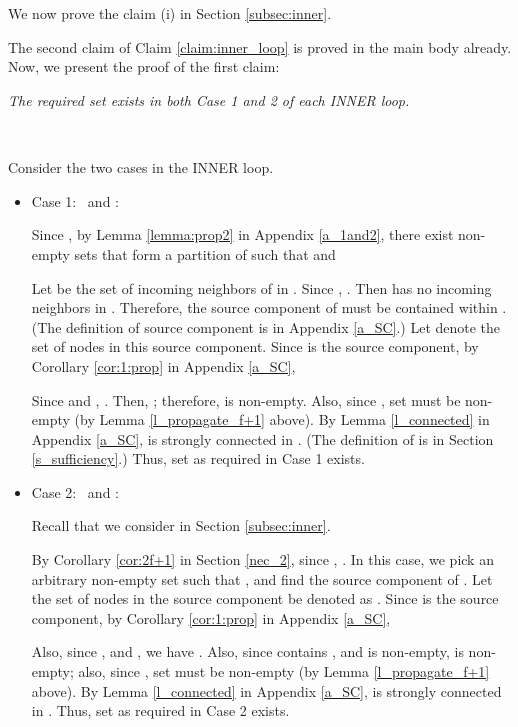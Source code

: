 \documentclass[letterpaper, 11pt]{article}
\begin{document}
~

~

\noindent


We now prove the claim (i) in Section \ref{subsec:inner}. \\








The second claim of Claim \ref{claim:inner_loop} is proved in the main body already. Now, we present the proof of the first claim:

\noindent
{\em The required set  exists in both Case 1 and 2 of each INNER loop.}

~

Consider the two cases in the INNER loop.
\begin{itemize}
\item{Case 1:~}
  and :

Since , by Lemma \ref{lemma:prop2} in Appendix \ref{a_1and2},
there exist non-empty sets  that form a partition of
  such that  and

Let  be the set of incoming neighbors of  in .
Since , . Then
 has no incoming neighbors in . Therefore, the
source component of  
must be contained within . (The definition of source component is in Appendix \ref{a_SC}.)
Let  denote the set of nodes in this source component.
Since  is the source component, 
by Corollary \ref{cor:1:prop} in Appendix \ref{a_SC},

Since  and , .
Then, ; therefore,  is non-empty.
Also, since , set  must be non-empty
(by Lemma \ref{l_propagate_f+1} above).
By Lemma \ref{l_connected} in Appendix \ref{a_SC},  is strongly connected in . (The definition of  is in Section \ref{s_sufficiency}.)
Thus, set  as required in Case 1 exists.

\item{Case 2:~}
  and :

Recall that we consider  in Section \ref{subsec:inner}. 



By Corollary \ref{cor:2f+1} in Section \ref{nec_2}, since , . 
In this case, we pick an arbitrary non-empty set  such that , and find the source component of . 
Let the set of nodes in the source component be denoted as .
Since  is the source component, 
by Corollary \ref{cor:1:prop} in Appendix \ref{a_SC},

Also, since , and ,
we have .
Also, since  contains , and  is non-empty,
 is non-empty; also, since ,
set  must be non-empty (by Lemma \ref{l_propagate_f+1} above).
By Lemma \ref{l_connected} in Appendix \ref{a_SC},  is strongly connected in .
Thus, set  as required in Case 2 exists.
\end{itemize}
\end{document}
